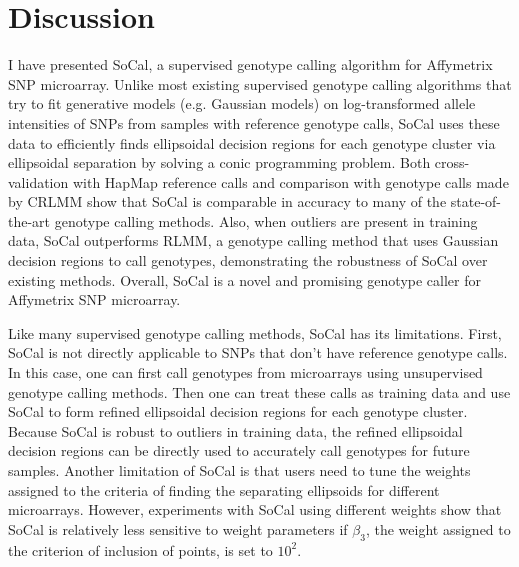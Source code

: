 \documentclass{scrartcl}
\begin{document}
\section{Discussion}

\par
I have presented SoCal, a supervised genotype calling algorithm for Affymetrix
SNP microarray.
Unlike most existing supervised genotype calling algorithms that try to fit
generative models (e.g. Gaussian models) on log-transformed allele
intensities of SNPs from samples with reference genotype calls,
SoCal uses these data to efficiently finds ellipsoidal decision regions for
each genotype cluster via ellipsoidal separation by solving a conic
programming problem.
Both cross-validation with HapMap reference calls and comparison with
genotype calls made by CRLMM show that SoCal is comparable in accuracy to many
of the state-of-the-art genotype calling methods.
Also, when outliers are present in training data, SoCal outperforms RLMM, a
genotype calling method that uses Gaussian decision regions to call genotypes,
demonstrating the robustness of SoCal over existing methods.
Overall, SoCal is a novel and promising genotype caller for
Affymetrix SNP microarray.

\par
Like many supervised genotype calling methods, SoCal has its limitations.
First, SoCal is not directly applicable to SNPs that don't have
reference genotype calls.
In this case, one can first call genotypes from microarrays using
unsupervised genotype calling methods.
Then one can treat these calls as training data and use SoCal to
form refined ellipsoidal decision regions for each genotype cluster.
Because SoCal is robust to outliers in training data, the refined
ellipsoidal decision regions can be directly used to accurately call genotypes
for future samples.
Another limitation of SoCal is that users need to tune the weights
assigned to the criteria of finding the separating ellipsoids
for different microarrays.
However, experiments with SoCal using different weights show that SoCal is
relatively less sensitive to weight parameters if $\beta_3$, the weight
assigned to the criterion of inclusion of points, is set to $10^2$.
\end{document}
